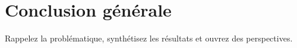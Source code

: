 \chapter*{Conclusion générale}

Rappelez la problématique, synthétisez les résultats et ouvrez des perspectives.
